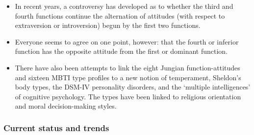 \begin{itemize}
\item In recent years, a controversy has developed as to whether the third and
fourth functions continue the alternation of attitudes (with respect to
extraversion or introversion) begun by the first two functions.

\item Everyone seems to agree on one point, however: that the fourth or
inferior function has the opposite attitude from the first or dominant
function.

\item There have also been attempts to link the eight Jungian
function-attitudes and sixteen MBTI type profiles to a new notion of
temperament, Sheldon's body types, the DSM-IV personality disorders, and the
`multiple intelligences' of cognitive psychology. The types have been linked to
religious orientation and moral decision-making styles.

\end{itemize}

\subsubsection{Current status and trends}

